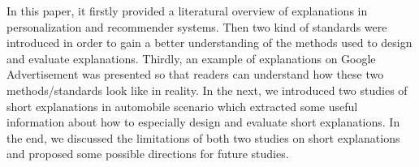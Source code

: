 \indent In this paper, it firstly provided a literatural overview of explanations in personalization and recommender systems.
Then two kind of standards were introduced in order to 
gain a better understanding of the methods used to design and evaluate explanations.
Thirdly, an example of explanations on Google Advertisement was presented so that readers can understand how 
these two methods/standards look like in reality. 
In the next, we introduced two studies of short explanations in automobile scenario
which extracted some useful information about how to especially design and evaluate short explanations.
In the end, we discussed the limitations of both two studies on short explanations and proposed some possible directions for future studies.